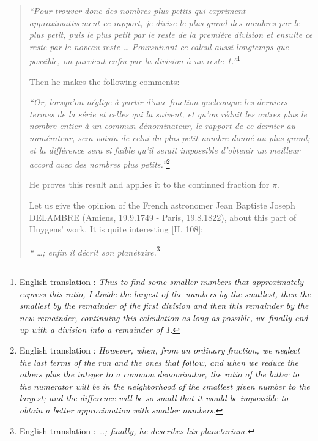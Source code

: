 \begin{quote}
\emph{``Pour trouver donc des nombres plus petits qui expriment
approximativement ce rapport, je divise le plus grand des nombres
par le plus petit, puis le plus petit par le reste de la premi\`ere 
division et ensuite ce reste par le noveau reste \ldots{}
Poursuivant ce calcul aussi longtemps que possible, on parvient
enfin par la division \`a un reste 1.''}\footnote{English
translation 
\cite{bibref:i:sandrinederaspide}:  \emph{Thus to find some smaller numbers that 
approximately express this ratio, I divide the largest of 
the numbers by the smallest, then the smallest by the 
remainder of the first division and then this remainder by 
the new remainder, continuing this calculation as long as possible, 
we finally end up with a division into a remainder of 1.}}

Then he makes the following comments:

\emph{``Or, lorsqu'on n\'eglige \`a partir d'une fraction
quelconque les derniers termes de la s\'erie et celles qui
la suivent, et qu'on r\'eduit les autres plus le
nombre entier \`a un commun d\'enominateur, le rapport de ce
dernier au num\'erateur, sera voisin de celui du plus
petit nombre donn\'e au plus grand; et la diff\'erence
sera si faible qu'il serait impossible d'obtenir un meilleur accord
avec des nombres plus petits.''}\footnote{English
translation 
\cite{bibref:i:sandrinederaspide}:  
\emph{However, when, from an ordinary fraction, we neglect 
the last terms of the run and the ones that follow, and when 
we reduce the others plus the integer to a common denominator, 
the ratio of the latter to the numerator will be in the neighborhood 
of the smallest given number to the largest; and the difference will 
be so small that it would be impossible to obtain a better 
approximation with smaller numbers.}}

He proves this result and applies it to the continued fraction
for $\pi$.

Let us give the opinion of the French astronomer 
Jean Baptiste 
Joseph DELAMBRE (Amiens, 19.9.1749 - Paris, 19.8.1822), about 
this part of Huygens' work.  It is quite interesting [H. 108]:

\emph{`` \ldots{}; enfin il d\'ecrit son plan\'etaire.}\footnote{English
translation 
\cite{bibref:i:sandrinederaspide}:  
\emph{\ldots{}; finally, he describes his planetarium.}}


\end{quote}
